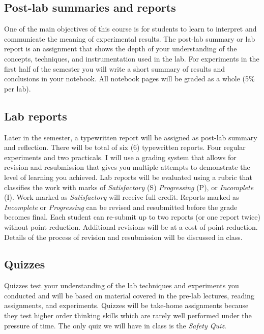 \hypertarget{post-lab-summaries-and-reports}{%
\subsection{Post-lab summaries and
reports}\label{post-lab-summaries-and-reports}}

One of the main objectives of this course is for students to learn to
interpret and communicate the meaning of experimental results. The
post-lab summary or lab report is an assignment that shows the depth of
your understanding of the concepts, techniques, and instrumentation used
in the lab. For experiments in the first half of the semester you will
write a short summary of results and conclusions in your notebook. All
notebook pages will be graded as a whole (5\% per lab).

\hypertarget{lab-reports}{%
\subsection{Lab reports}\label{lab-reports}}

Later in the semester, a typewritten report will be assigned as post-lab
summary and reflection. There will be total of six (6) typewritten
reports. Four regular experiments and two practicals. I will use a
grading system that allows for revision and resubmission that gives you
multiple attempts to demonstrate the level of learning you achieved. Lab
reports will be evaluated using a rubric that classifies the work with
marks of \emph{Satisfactory} (S) \emph{Progressing} (P), or
\emph{Incomplete} (I). Work marked as \emph{Satisfactory} will receive
full credit. Reports marked as \emph{Incomplete} or \emph{Progressing}
can be revised and resubmitted before the grade becomes final. Each
student can re-submit up to two reports (or one report twice) without
point reduction. Additional revisions will be at a cost of point
reduction. Details of the process of revision and resubmission will be
discussed in class.

\hypertarget{quizzes}{%
\subsection{Quizzes}\label{quizzes}}

Quizzes test your understanding of the lab techniques and experiments
you conducted and will be based on material covered in the pre-lab
lectures, reading assignments, and experiments. Quizzes will be
take-home assignments because they test higher order thinking skills
which are rarely well performed under the pressure of time. The only
quiz we will have in class is the \emph{Safety Quiz}.

